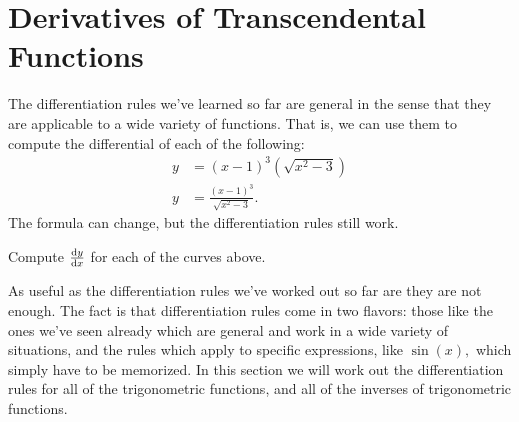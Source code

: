 \section{Derivatives of Transcendental Functions}
\label{sec:diff-transc-funct}

The differentiation rules we've learned so far are general in the
sense that they are applicable to a wide variety of functions. That is, we
can use them to compute the differential of each of the following:
\begin{align*}
  y&=(x-1)^3\left(\sqrt{x^2-3}\right)\\[2mm]
  y&=\frac{(x-1)^3}{\sqrt{x^2-3}}.
\end{align*}
The formula can change, but the differentiation rules still work.

\begin{embeddedproblem}{}
  Compute $\frac{\text{d}{y}}{\text{d}{x}}$ for each of the curves above.
\end{embeddedproblem}





As useful as the differentiation rules we've worked out so far are
they are not enough. The fact is that differentiation rules come
in two flavors: those like the ones we've seen already which are
general and work in a wide variety of situations, and the rules which
apply to specific expressions, like $\sin(x),$ which simply have to be
memorized. In this section we will work out the differentiation rules
for all of the trigonometric functions, and all of the inverses of
trigonometric functions.

